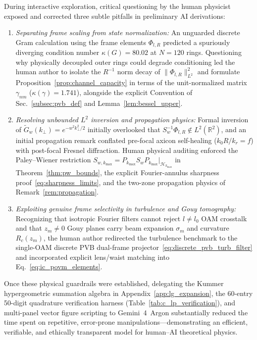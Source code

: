 \documentclass[aps,pra,onecolumn,notitlepage,11pt,tightenlines,amsmath,amssymb,floatfix,longbibliography]{revtex4-2}
\providecommand{\norm}[1]{\lVert#1\rVert}
\begin{document}
During interactive exploration, critical questioning by the human physicist exposed and corrected three subtle pitfalls in preliminary AI derivations:
\begin{enumerate}
\item \emph{Separating frame scaling from state normalization:} An unguarded discrete Gram calculation using the frame elements $\Phi_{l,R}$ predicted a spuriously diverging condition number $\kappa(G) = 80.02$ at $N = 120$ rings. Questioning why physically decoupled outer rings could degrade conditioning led the human author to isolate the $R^{-1}$ norm decay of $\norm{\Phi_{l,R}}_{L^2}^2$ and formulate Proposition~\ref{prop:channel_capacity} in terms of the unit-normalized matrix $\gamma_{nm}$ ($\kappa(\gamma) = 1.741$), alongside the explicit Convention of Sec.~\ref{subsec:pvb_def} and Lemma~\ref{lem:bessel_upper}.
\item \emph{Resolving unbounded $L^2$ inversion and propagation physics:} Formal inversion of $\widetilde{G}_w(k_\perp) = e^{-w^2 k_\perp^2/2}$ initially overlooked that $S_w^{-1}\Phi_{l,R} \notin L^2(\mathbb{R}^2)$, and an initial propagation remark conflated pre-focal axicon self-healing ($k_0 R/k_r = f$) with post-focal Fresnel diffraction. Human physical auditing enforced the Paley--Wiener restriction $S_{w,k_{\max}} = P_{k_{\max}}S_w P_{k_{\max}}\big|_{\mathcal{H}_{k_{\max}}}$ in Theorem~\ref{thm:pw_bounds}, the explicit Fourier-annulus sharpness proof~\eqref{eq:sharpness_limits}, and the two-zone propagation physics of Remark~\ref{rem:propagation}.
\item \emph{Exploiting genuine frame selectivity in turbulence and Gouy tomography:} Recognizing that isotropic Fourier filters cannot reject $l \neq l_0$ OAM crosstalk and that $z_m \neq 0$ Gouy planes carry beam expansion $\sigma_m$ and curvature $R_c(z_m)$, the human author redirected the turbulence benchmark to the single-OAM discrete PVB dual-frame projector~\eqref{eq:discrete_pvb_turb_filter} and incorporated explicit lens/waist matching into Eq.~\eqref{eq:ic_povm_elements}.
\end{enumerate}
Once these physical guardrails were established, delegating the Kummer hypergeometric summation algebra in Appendix~\ref{app:lg_expansion}, the 60-entry 50-digit quadrature verification harness (Table~\ref{tab:c_lp_verification}), and multi-panel vector figure scripting to Gemini~4~Argon substantially reduced the time spent on repetitive, error-prone manipulations—demonstrating an efficient, verifiable, and ethically transparent model for human--AI theoretical physics.
\end{document}
